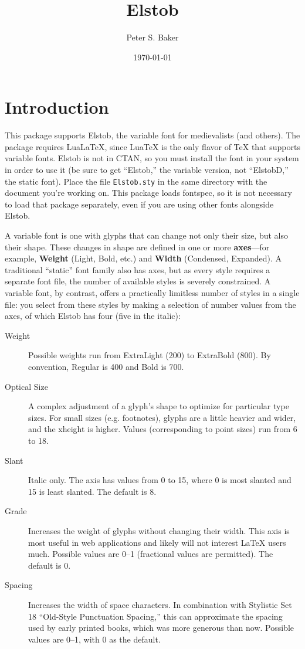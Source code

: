 \documentclass[12pt]{article}
\title{Elstob}
\author{Peter S. Baker}
\date{\today}
\newcommand{\ltech}{Lua\kern-1.5pt\TeX}
\newcommand{\lltech}{Lua\LaTeX}
\newcommand{\fspec}{{\sffamily fontspec}}
\begin{document}
\maketitle

\section{Introduction}

This package supports Elstob, the variable font for medievalists (and others).
The package requires \lltech, since {\ltech} is
the only flavor of {\TeX} that supports variable fonts. Elstob is not in CTAN, so you must
install the font in your system in order to use it (be sure to get “Elstob,” the variable
version, not “ElstobD,” the static font). Place the file {\verb|Elstob.sty|} in the same
directory with the document you're working on. This package loads
\fspec, so it is not necessary to load that package separately, even if you are using
other fonts alongside Elstob.

A variable font is one with glyphs that can change not only their size, but also their
shape. These changes in shape are defined in one or more \textbf{axes}---for example,
\textbf{Weight} (Light, Bold, etc.) and \textbf{Width} (Condensed, Expanded). A traditional
“static” font family also has axes, but as every style requires a separate font file,
the number of available styles is severely constrained. A variable font, by contrast,
offers a practically limitless number of styles in a single file: you select from these styles
by making a selection of number values from the axes, of which Elstob has four (five in the italic):

\begin{description}
    \item[Weight] Possible weights run from ExtraLight (200) to ExtraBold (800). By
    convention, Regular is 400 and Bold is 700.
    \item[Optical Size] A complex adjustment of a glyph's shape to
    optimize for particular type sizes. For small sizes (e.g. footnotes), glyphs are
    a little heavier and wider, and the xheight is higher. Values (corresponding to
    point sizes) run from 6 to 18.
    \item[Slant] Italic only. The axis has values from 0 to 15, where 0 is most
    slanted and 15 is least slanted. The default is 8.
    \item[Grade] Increases the weight of glyphs without changing their width. This
    axis is most useful in web applications and likely will not interest {\LaTeX} users
    much. Possible values are 0–1 (fractional values are permitted). The default is 0.
    \item[Spacing] Increases the width of space characters. In combination with
    Stylistic Set 18 “Old-Style Punctuation Spacing,” this can approximate the
    spacing used by early printed books, which was more generous than now.
    Possible values are 0–1, with 0 as the default.
\end{description}
\end{document}

